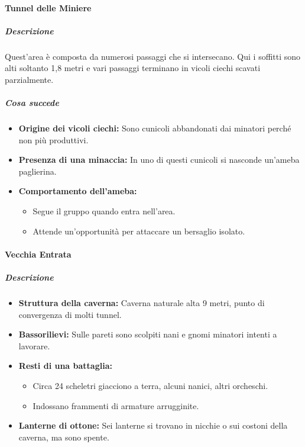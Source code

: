 \documentclass{article}
\begin{document}
        \paragraph{Tunnel delle Miniere}

        \subparagraph{Descrizione} Quest'area è composta da numerosi passaggi che si intersecano. Qui i soffitti sono alti soltanto 1,8 metri e vari passaggi terminano in vicoli ciechi scavati parzialmente.
        
        \subparagraph{Cosa succede}
        \begin{itemize}
            \item \textbf{Origine dei vicoli ciechi:} Sono cunicoli abbandonati dai minatori perché non più produttivi.
            \item \textbf{Presenza di una minaccia:} In uno di questi cunicoli si nasconde un'ameba paglierina.
            \item \textbf{Comportamento dell'ameba:}
            \begin{itemize}
                \item Segue il gruppo quando entra nell’area.
                \item Attende un’opportunità per attaccare un bersaglio isolato.
            \end{itemize}
        \end{itemize}
        

        \paragraph{Vecchia Entrata}

\subparagraph{Descrizione}
\begin{itemize}
    \item \textbf{Struttura della caverna:} Caverna naturale alta 9 metri, punto di convergenza di molti tunnel.
    \item \textbf{Bassorilievi:} Sulle pareti sono scolpiti nani e gnomi minatori intenti a lavorare.
    \item \textbf{Resti di una battaglia:}
    \begin{itemize}
        \item Circa 24 scheletri giacciono a terra, alcuni nanici, altri orcheschi.
        \item Indossano frammenti di armature arrugginite.
    \end{itemize}
    \item \textbf{Lanterne di ottone:} Sei lanterne si trovano in nicchie o sui costoni della caverna, ma sono spente.
\end{itemize}
\end{document}
